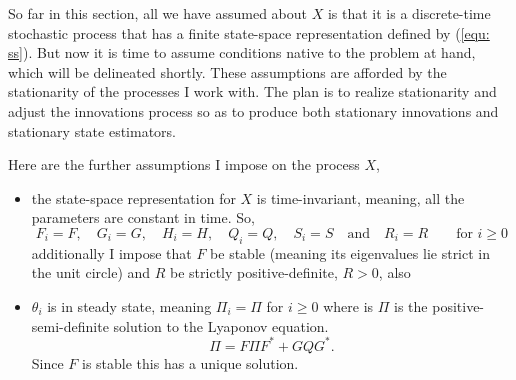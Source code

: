 \documentclass[12pt]{amsart}
\begin{document}
So far in this section, all we have assumed about $X$ is that it is a discrete-time stochastic process that has a finite state-space representation defined by (\ref{equ: ss}). But now it is time to assume conditions native to the problem at hand, which will be delineated shortly. These assumptions are afforded by the stationarity of the processes I work with.  The plan is to realize stationarity and adjust the innovations process so as to produce both stationary innovations and stationary state estimators.

Here are the further assumptions I impose on the process $X$, 
\begin{itemize}
	\item the state-space representation for $X$ is time-invariant, meaning, all the parameters are constant in time. So,
	$$F_i = F,\quad G_i=G, \quad H_i = H,\quad Q_i=Q, \quad S_i=S \quad\text{and}\quad R_i = R\qquad \text{for }i\ge 0$$
	additionally I impose that $F$ be stable (meaning its eigenvalues lie strict in the unit circle) and $R$ be strictly positive-definite, $R>0$, also 
	\item $\theta_i$ is in  steady state, meaning $\Pi_i = \Pi$ for $i\ge 0$ where is $\Pi$ is the positive-semi-definite solution to the Lyaponov equation. 
	\begin{equation}
	\Pi = F\Pi F^* + GQG^*.
	\label{equ: state Lyapunov}
	\end{equation}
	 Since $F$ is stable this has a unique solution. 
\end{itemize}
\end{document}

